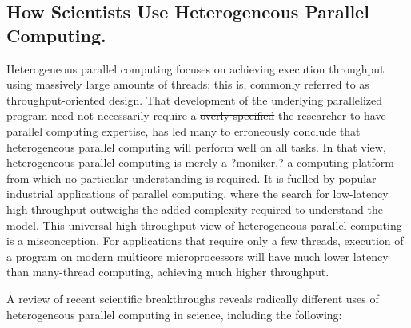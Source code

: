 \documentclass[10pt]{article}[draft]
\begin{document}
\newpage
\begin{center}
	\subsection*{How Scientists Use Heterogeneous Parallel Computing.}
\end{center}
Heterogeneous parallel computing  focuses on achieving execution throughput using massively large amounts of threads; this is, commonly referred to as throughput-oriented design. That development of  the underlying  parallelized program  need not necessarily require a \st{overly specified}  the researcher to have parallel  computing  expertise, has led many to erroneously conclude that heterogeneous parallel computing will perform well on all tasks. In that view, heterogeneous parallel computing  is merely a ?moniker,? a computing platform from which no particular understanding is required. It is fuelled by popular industrial applications of parallel computing, where the search for low-latency high-throughput outweighs the added complexity required to understand the model. This universal high-throughput view of heterogeneous parallel computing is a misconception.  For applications that require only a few threads, execution of a program on modern multicore microprocessors will have much lower latency than many-thread computing, achieving much higher throughput.  
	
A review of recent scientific breakthroughs reveals radically different uses of heterogeneous parallel computing in science, including the following:
	
\end{document}
